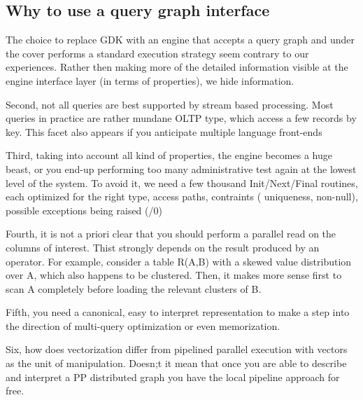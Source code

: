 \documentclass[10pt,twocolumn,fleqn]{article}
\begin{document}
\subsection{Why to use a query graph interface}
The choice to replace GDK with an engine that accepts a query graph and
under the cover performs a standard execution strategy seem contrary to
our experiences. Rather then making more of the detailed information visible
at the engine interface layer (in terms of properties), we hide information.

Second, not all queries are best supported by stream based processing. Most
queries in practice are rather mundane OLTP type, which access a few records
by key. This facet also appears if you anticipate multiple language 
front-ends

Third, taking into account all kind of properties, the engine becomes a huge
beast, or you end-up performing too many  administrative test again at the
lowest level of the system. To avoid it, we need a few thousand Init/Next/Final
routines, each optimized for the right type, access paths, contraints (
uniqueness, non-null), possible exceptions being raised (/0)

Fourth, it is not a priori clear that you should perform a parallel read
on the columns of interest. Thist strongly depends on the result
produced by an operator. For example, consider a table R(A,B) with a
skewed value distribution over A, which also happens to be clustered.
Then, it makes more sense first to scan A completely before loading the
relevant clusters of B.

Fifth, you need a canonical, easy to interpret representation to make a
step into the direction of multi-query optimization or even memorization.

Six, how does vectorization differ from pipelined parallel execution with
vectors as the unit of manipulation. Doesn;t it mean that once you are
able to describe and interpret a PP distributed graph you have the
local pipeline approach for free.
\end{document}

